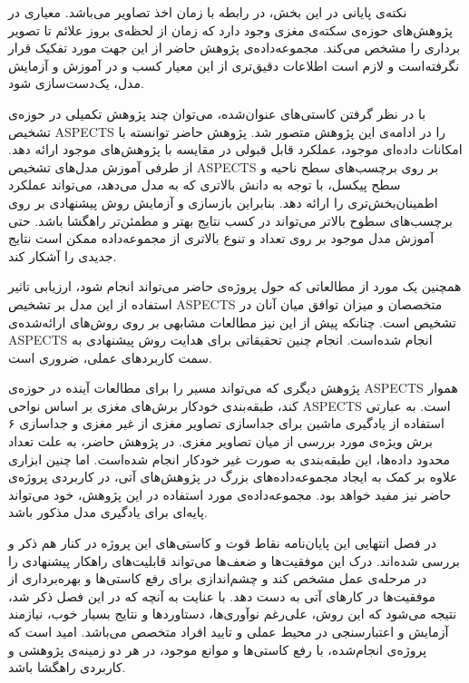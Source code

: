 نکته‌ی پایانی در این بخش، در رابطه با زمان اخذ تصاویر می‌باشد.
معیاری در پژوهش‌های حوزه‌ی سکته‌ی مغزی وجود دارد که زمان از لحظه‌ی بروز علائم تا تصویر برداری را مشخص می‌کند.
مجموعه‌داده‌ی پژوهش حاضر از این جهت مورد تفکیک قرار نگرفته‌است و لازم است اطلاعات دقیق‌تری از این معیار کسب و در آموزش و آزمایش مدل، یک‌دست‌سازی شود.


با در نظر گرفتن کاستی‌های عنوان‌شده، می‌توان چند پژوهش تکمیلی در حوزه‌ی تشخیص ASPECTS را در ادامه‌ی این پژوهش متصور شد.
پژوهش حاضر توانسته با امکانات داده‌ای موجود، عملکرد قابل قبولی در مقایسه با پژوهش‌های موجود ارائه دهد.
از طرفی
آموزش مدل‌های تشخیص ASPECTS بر روی برچسب‌های سطح ناحیه و سطح پیکسل، با توجه به دانش بالاتری که به مدل می‌دهد، می‌تواند عملکرد اطمینان‌بخش‌تری را ارائه دهد.
بنابراین بازسازی و آزمایش روش پیشنهادی بر روی برچسب‌های سطوح بالاتر می‌تواند در کسب نتایج بهتر و مطمئن‌تر راهگشا باشد.
حتی آموزش مدل موجود بر روی تعداد و تنوع بالاتری از مجموعه‌داده ممکن است نتایج جدیدی را آشکار کند.

همچنین یک مورد از مطالعاتی که حول پروژه‌ی حاضر می‌تواند انجام شود، ارزیابی تاثیر استفاده از این مدل بر تشخیص ASPECTS متخصصان و 
میزان توافق میان آنان در تشخیص است.
چنانکه پیش از این نیز مطالعات مشابهی بر روی روش‌های ارائه‌شده‌ی ASPECTS انجام شده‌است.
انجام چنین تحقیقاتی برای هدایت روش پیشنهادی به سمت کاربرد‌های عملی، ضروری است.

پژوهش دیگری که می‌تواند مسیر را برای مطالعات آینده در حوزه‌ی ASPECTS هموار کند، 
طبقه‌بندی خودکار برش‌های مغزی بر اساس نواحی ASPECTS است.
به عبارتی استفاده از یادگیری ماشین برای جداسازی تصاویر مغزی از غیر مغزی و جداسازی ۶ برش ویژه‌ی مورد بررسی از میان تصاویر مغزی.
در پژوهش حاضر، به علت تعداد محدود داد‌ه‌ها، این طبقه‌بندی به صورت غیر خودکار انجام شده‌است.
اما چنین ابزاری علاوه بر 
کمک به ایجاد مجموعه‌داده‌های بزرگ در پژوهش‌های آتی، در کاربردی پروژه‌ی حاضر نیز مفید خواهد بود.
مجموعه‌داده‌ی مورد استفاده در این پژوهش، خود می‌تواند پایه‌ای برای یادگیری مدل مذکور باشد.


در فصل انتهایی این پایان‌نامه
نقاط قوت و کاستی‌های این پروژه در کنار هم ذکر و بررسی شده‌اند.
درک این موفقیت‌ها و ضعف‌ها می‌تواند قابلیت‌های راهکار پیشنهادی را در مرحله‌ی عمل مشخص کند و چشم‌اندازی برای رفع کاستی‌ها و 
بهره‌برداری از موفقیت‌ها در کار‌های آتی به دست دهد.
با عنایت به آنچه که در این فصل ذکر شد، نتیجه می‌شود که این روش، علی‌رغم نوآوری‌ها، دستاورد‌ها و نتایج بسیار خوب، نیازمند آزمایش و 
اعتبارسنجی در محیط عملی و تایید افراد متخصص می‌باشد. امید است که پروژه‌ی انجام‌شده، با رفع کاستی‌ها و موانع موجود، در هر دو زمینه‌ی پژوهشی و کاربردی راهگشا باشد.
